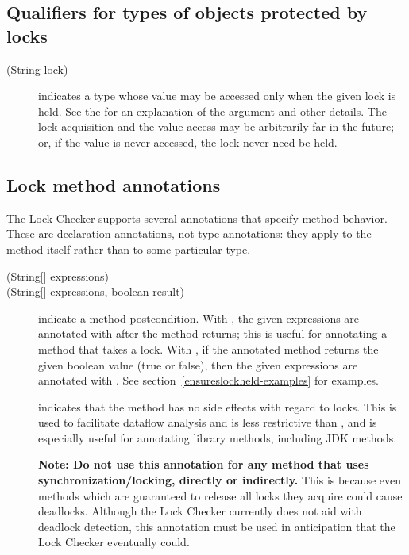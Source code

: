 \subsection{Qualifiers for types of objects protected by locks}

\begin{description}
\item[\small{(String lock)}]
  indicates a type whose value may be accessed only when the given lock is
  held.
  See the  for an explanation of the argument and other details.  The lock
  acquisition and the value access may be arbitrarily far in the future;
  or, if the value is never accessed, the lock never need be held.
\end{description}

\subsection{Lock method annotations}

The Lock Checker supports several annotations that specify method behavior.
These are declaration annotations, not type annotations: they apply to the
method itself rather than to some particular type.

\begin{description}
\item[\small{(String[] expressions)}]
\item[\small{(String[] expressions, boolean result)}]
  indicate a method postcondition. With , the given
  expressions are annotated with  after the method returns; this
  is useful for annotating a method that takes a lock.
  With , if the annotated method returns the given
  boolean value (true or false), then the given expressions are annotated
  with .  See section~\ref{ensureslockheld-examples} for examples.

\item[]
  indicates that the method has no side effects with regard to
  locks.  This is used to facilitate dataflow analysis and is
  less restrictive than ,
  and is especially useful for annotating library methods,
  including JDK methods.
  
  \textbf{Note: Do not use this annotation
  for any method that uses synchronization/locking, directly or
  indirectly.}  This is because even methods which are guaranteed
  to release all locks they acquire could cause deadlocks.
  Although the Lock Checker currently does not aid with deadlock
  detection, this annotation must be used in anticipation that
  the Lock Checker eventually could.
\end{description}

